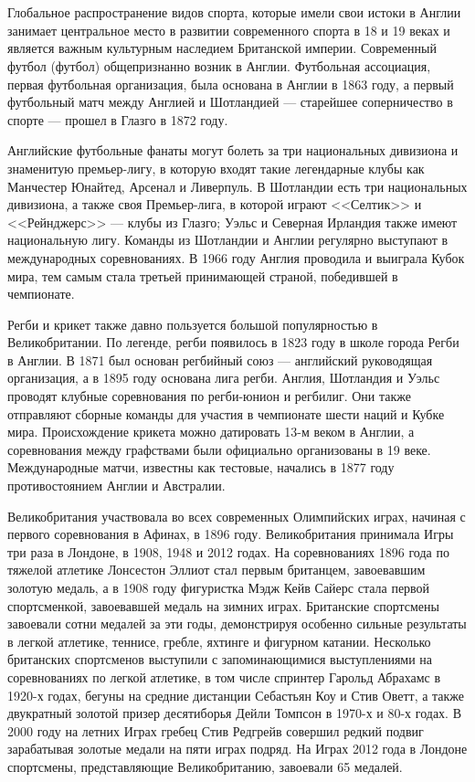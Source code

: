 \section{}
\subsection{}

Глобальное распространение видов спорта, которые имели свои истоки в Англии занимает центральное место в развитии современного спорта в 18 и 19 веках и является важным культурным наследием Британской империи. Современный футбол (футбол) общепризнанно возник в Англии. Футбольная ассоциация, первая футбольная организация, была основана в Англии в 1863 году, а первый футбольный матч между Англией и Шотландией — старейшее соперничество в спорте — прошел в Глазго в 1872 году.

Английские футбольные фанаты могут болеть за три национальных дивизиона и знаменитую премьер-лигу, в которую входят такие легендарные клубы как Манчестер Юнайтед, Арсенал и Ливерпуль. В Шотландии есть три национальных дивизиона, а также своя Премьер-лига, в которой играют <<Селтик>> и <<Рейнджерс>> --- клубы из Глазго; Уэльс и Северная Ирландия также имеют национальную лигу. Команды из Шотландии и Англии регулярно выступают в международных соревнованиях. В 1966 году Англия проводила и выиграла Кубок мира, тем самым стала третьей принимающей страной, победившей в чемпионате.

Регби и крикет также давно пользуется большой популярностью в Великобритании. По легенде, регби появилось в 1823 году в школе города Регби в Англии. В 1871 был основан регбийный союз --- английский руководящая организация, а в 1895 году основана лига регби. Англия, Шотландия и Уэльс проводят клубные соревнования по регби-юнион и регбилиг. Они также отправляют сборные команды для участия в чемпионате шести наций и Кубке мира. Происхождение крикета можно датировать 13-м веком в Англии, а соревнования между графствами были официально организованы в 19 веке. Международные матчи, известны как тестовые, начались в 1877 году противостоянием Англии и Австралии.

Великобритания участвовала во всех современных Олимпийских играх, начиная с первого соревнования в Афинах, в 1896 году. Великобритания принимала Игры три раза в Лондоне, в 1908, 1948 и 2012 годах. На соревнованиях 1896 года по тяжелой атлетике Лонсестон Эллиот стал первым британцем, завоевавшим золотую медаль, а в 1908 году фигуристка Мэдж Кейв Сайерс стала первой спортсменкой, завоевавшей медаль на зимних играх. Британские спортсмены завоевали сотни медалей за эти годы, демонстрируя особенно сильные результаты в легкой атлетике, теннисе, гребле, яхтинге и фигурном катании. Несколько британских спортсменов выступили с запоминающимися выступлениями на соревнованиях по легкой атлетике, в том числе спринтер Гарольд Абрахамс в 1920-х годах, бегуны на средние дистанции Себастьян Коу и Стив Оветт, а также двукратный золотой призер десятиборья Дейли Томпсон в 1970-х и 80-х годах. В 2000 году на летних Играх гребец Стив Редгрейв совершил редкий подвиг зарабатывая золотые медали на пяти играх подряд. На Играх 2012 года в Лондоне спортсмены, представляющие Великобританию, завоевали 65 медалей.

